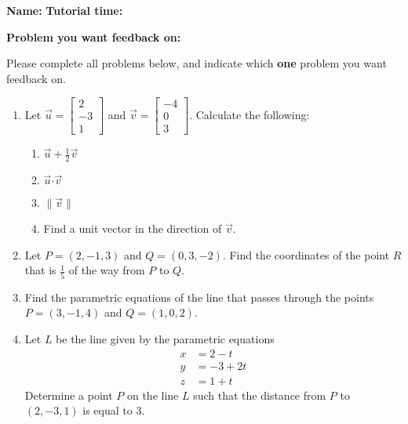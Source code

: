 \documentclass[12pt]{article}
\newcommand{\len}[1]{\lVert #1\rVert}
\newcommand{\dotp}{\boldsymbol{\cdot}}
\newcommand{\bbm}{\begin{bmatrix}}
\newcommand{\ebm}{\end{bmatrix}}
\begin{document}
{\bf \large Name:} \hspace{2.5in} {\bf Tutorial time:}

\bigskip

{\bf Problem you want feedback on:}

\bigskip

\thispagestyle{fancy}
Please complete all problems below, and indicate which {\bf one} problem you want feedback on.
 \begin{enumerate}
 \item  Let $\vec{u} = \begin{bmatrix}2\\-3\\1\end{bmatrix}$ and $\vec{v} = \bbm -4\\0\\3\ebm$. Calculate the following:
\begin{enumerate}
 \item $\vec{u}+\frac{1}{2}\vec{v}$

\vspace{0.8in}

 \item $\vec{u}\dotp \vec{v}$

\vspace{0.8in}

 \item $\len{\vec{v}}$

\vspace{0.8in}

 \item Find a unit vector in the direction of $\vec{v}$.

\vspace{1.2in}
\end{enumerate}
\item Let $P=(2,-1,3)$ and $Q=(0,3,-2)$. Find the coordinates of the point $R$ that is $\frac{1}{5}$ of the way from $P$ to $Q$.

\newpage

\item Find the parametric equations of the line that passes through the points $P=(3,-1,4)$ and $Q=(1,0,2)$.

\vspace{3in}

\item Let $L$ be the line given by the parametric equations
\begin{align*}
 x&=2-t\\
 y&=-3+2t\\
 z&=1+t
\end{align*}
Determine a point $P$ on the line $L$ such that the distance from $P$ to $(2,-3,1)$ is equal to 3.

 \end{enumerate}
\end{document}
